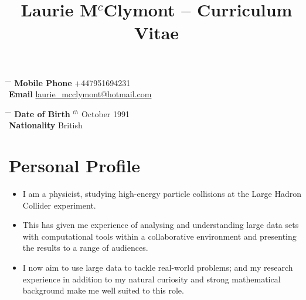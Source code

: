 \documentclass[10pt]{article} %
\begin{document}

\title{Laurie M$^{c}$Clymont -- Curriculum Vitae} %
\vspace{-5mm}


\parbox{0.5\textwidth}{ %
\begin{tabbing} %
\hspace{3cm} \= \hspace{4cm} \= \kill %
{\bf Mobile Phone} \> +447951694231 \\ %
{\bf Email} \> \href{mailto:laurie_mcclymont@hotmail.com}{laurie\_mcclymont@hotmail.com} \\ %
\end{tabbing}}
\hspace{2cm} %
\parbox{0.5\textwidth}{ %
\begin{tabbing} %
\hspace{3cm} \= \hspace{4cm} \= \kill %
{\bf Date of Birth} $^{th}$ October 1991 \\ %
{\bf Nationality} \> British \\ %
\end{tabbing}}


\vspace{-9mm}
\section{Personal Profile}
\begin{itemize}
\item{I am a physicist, studying high-energy particle collisions at the Large Hadron Collider experiment.}
\item{This has given me experience of analysing and understanding large data sets with computational tools within
  a collaborative environment and presenting the results to a range of audiences.}
\item{I now aim to use large data to tackle real-world problems; and my research experience in addition to my natural curiosity
  and strong mathematical %
  background make me well suited to this role.}
\end{itemize}
\end{document}
